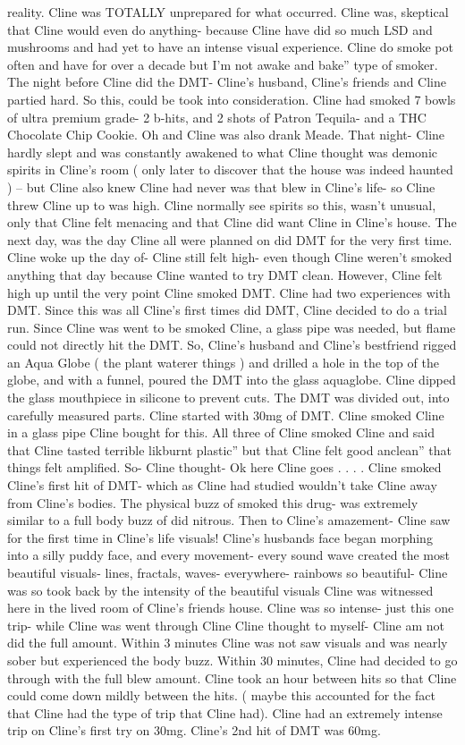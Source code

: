 \documentclass[12pt]{book}
\begin{document}
reality. Cline was TOTALLY unprepared for what occurred. Cline was, skeptical that Cline would even do anything- because Cline have did so much LSD and mushrooms and had yet to have an intense visual experience. Cline do smoke pot often and have for over a decade but I'm not awake and bake'' type of smoker. The night before Cline did the DMT- Cline's husband, Cline's friends and Cline partied hard. So this, could be took into consideration. Cline had smoked 7 bowls of ultra premium grade- 2 b-hits, and 2 shots of Patron Tequila- and a THC Chocolate Chip Cookie. Oh and Cline was also drank Meade. That night- Cline hardly slept and was constantly awakened to what Cline thought was demonic spirits in Cline's room ( only later to discover that the house was indeed haunted ) -- but Cline also knew Cline had never was that blew in Cline's life- so Cline threw Cline up to was high. Cline normally see spirits so this, wasn't unusual, only that Cline felt menacing and that Cline did want Cline in Cline's house. The next day, was the day Cline all were planned on did DMT for the very first time. Cline woke up the day of- Cline still felt high- even though Cline weren't smoked anything that day because Cline wanted to try DMT clean. However, Cline felt high up until the very point Cline smoked DMT. Cline had two experiences with DMT. Since this was all Cline's first times did DMT, Cline decided to do a trial run. Since Cline was went to be smoked Cline, a glass pipe was needed, but flame could not directly hit the DMT. So, Cline's husband and Cline's bestfriend rigged an Aqua Globe ( the plant waterer things ) and drilled a hole in the top of the globe, and with a funnel, poured the DMT into the glass aquaglobe. Cline dipped the glass mouthpiece in silicone to prevent cuts. The DMT was divided out, into carefully measured parts. Cline started with 30mg of DMT. Cline smoked Cline in a glass pipe Cline bought for this. All three of Cline smoked Cline and said that Cline tasted terrible likburnt plastic'' but that Cline felt good anclean'' that things felt amplified. So- Cline thought- Ok here Cline goes . . . . Cline smoked Cline's first hit of DMT- which as Cline had studied wouldn't take Cline away from Cline's bodies. The physical buzz of smoked this drug- was extremely similar to a full body buzz of did nitrous. Then to Cline's amazement- Cline saw for the first time in Cline's life visuals! Cline's husbands face began morphing into a silly puddy face, and every movement- every sound wave created the most beautiful visuals- lines, fractals, waves- everywhere- rainbows so beautiful- Cline was so took back by the intensity of the beautiful visuals Cline was witnessed here in the lived room of Cline's friends house. Cline was so intense- just this one trip- while Cline was went through Cline Cline thought to myself- Cline am not did the full amount. Within 3 minutes Cline was not saw visuals and was nearly sober but experienced the body buzz. Within 30 minutes, Cline had decided to go through with the full blew amount. Cline took an hour between hits so that Cline could come down mildly between the hits. ( maybe this accounted for the fact that Cline had the type of trip that Cline had). Cline had an extremely intense trip on Cline's first try on 30mg. Cline's 2nd hit of DMT was 60mg. 
\end{document}
